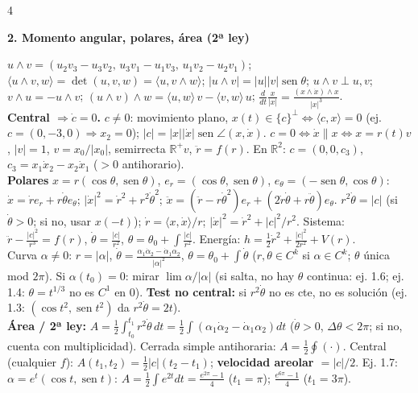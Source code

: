 \documentclass[8pt,a4paper,landscape]{extarticle}
\newcommand{\ip}[2]{\langle #1,#2\rangle}
\newcommand{\ab}[1]{\lvert #1\rvert}
\newcommand{\wg}{\wedge}
\newcommand{\xd}{\dot x}
\newcommand{\xdd}{\ddot x}
\newcommand{\R}{\mathbb{R}}
\DeclareMathOperator{\sen}{sen}
\newcommand{\seccion}[1]{\par\vspace{1.5pt}\noindent\colorbox{blue!12}{\parbox{\dimexpr\linewidth-2\fboxsep\relax}{\textbf{\textcolor{NavyBlue}{#1}}}}\par\vspace{0.5pt}}
\begin{document}
\begin{multicols}{4}
\seccion{2. Momento angular, polares, área (2ª ley)}
$u\wg v=(u_2v_3-u_3v_2,\,u_3v_1-u_1v_3,\,u_1v_2-u_2v_1)$; $\ip{u\wg v}{w}=\det(u,v,w)=\ip{u}{v\wg w}$; $\ab{u\wg v}=\ab u\ab v\sen\theta$; $u\wg v\perp u,v$; $v\wg u=-u\wg v$; $(u\wg v)\wg w=\ip uw\,v-\ip vw\,u$; $\frac{d}{dt}\frac{x}{\ab x}=\frac{(x\wg\xd)\wg x}{\ab x^3}$.\\
\textbf{Central $\Rightarrow\dot c=0$.}
$c\ne0$: movimiento plano, $x(t)\in\{c\}^\perp\iff\ip cx=0$ (ej. $c=(0,-3,0)\Rightarrow x_2=0$); $\ab c=\ab x\ab\xd\sen\angle(x,\xd)$.
$c=0\iff\xd\parallel x\iff x=r(t)v$, $\ab v=1$, $v=x_0/\ab{x_0}$, semirrecta $\R^+v$, $\ddot r=f(r)$.
En $\R^2$: $c=(0,0,c_3)$, $c_3=x_1\dot x_2-x_2\dot x_1$ ($>0$ antihorario).\\
\textbf{Polares} $x=r(\cos\theta,\sen\theta)$, $e_r=(\cos\theta,\sen\theta)$, $e_\theta=(-\sen\theta,\cos\theta)$:
$\xd=\dot re_r+r\dot\theta e_\theta$; $\ab\xd^2=\dot r^2+r^2\dot\theta^2$; $\xdd=(\ddot r-r\dot\theta^2)e_r+(2\dot r\dot\theta+r\ddot\theta)e_\theta$.
$r^2\dot\theta=\ab c$ (si $\dot\theta>0$; si no, usar $x(-t)$); $\dot r=\ip x\xd/r$; $\ab\xd^2=\dot r^2+\ab c^2/r^2$.
Sistema: $\ddot r-\frac{\ab c^2}{r^3}=f(r)$, $\dot\theta=\frac{\ab c}{r^2}$, $\theta=\theta_0+\!\int\!\frac{\ab c}{r^2}$. Energía: $h=\frac12\dot r^2+\frac{\ab c^2}{2r^2}+V(r)$.\\
Curva $\alpha\ne0$: $r=\ab\alpha$, $\dot\theta=\frac{\alpha_1\dot\alpha_2-\dot\alpha_1\alpha_2}{\ab\alpha^2}$, $\theta=\theta_0+\int\dot\theta$ ($r,\theta\in C^k$ si $\alpha\in C^k$; $\theta$ única mod $2\pi$). Si $\alpha(t_0)=0$: mirar $\lim\alpha/\ab\alpha$ (si salta, no hay $\theta$ continua: ej. 1.6; ej. 1.4: $\theta=t^{1/3}$ no es $C^1$ en 0).
\textbf{Test no central:} si $r^2\dot\theta$ no es cte, no es solución (ej. 1.3: $(\cos t^2,\sen t^2)$ da $r^2\dot\theta=2t$).\\
\textbf{Área / 2ª ley:} $A=\frac12\!\int_{t_0}^{t_1}\!r^2\dot\theta\,dt=\frac12\!\int(\alpha_1\dot\alpha_2-\dot\alpha_1\alpha_2)dt$ ($\dot\theta>0$, $\Delta\theta<2\pi$; si no, cuenta con multiplicidad). Cerrada simple antihoraria: $A=\frac12\oint(\cdot)$.
Central (cualquier $f$): $A(t_1,t_2)=\frac12\ab c(t_2-t_1)$; \textbf{velocidad areolar $=\ab c/2$}.
Ej. 1.7: $\alpha=e^t(\cos t,\sen t)$: $A=\frac12\!\int e^{2t}dt=\frac{e^{2\pi}-1}{4}$ ($t_1=\pi$); $\frac{e^{6\pi}-1}{4}$ ($t_1=3\pi$).


\end{multicols}
\end{document}
